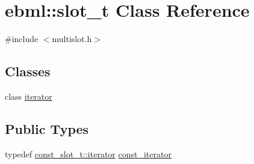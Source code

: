\hypertarget{classebml_1_1slot__t}{}\section{ebml\+:\+:slot\+\_\+t Class Reference}
\label{classebml_1_1slot__t}


{\ttfamily \#include $<$multislot.\+h$>$}

\subsection*{Classes}
\begin{DoxyCompactItemize}
\item 
class \mbox{\hyperlink{classebml_1_1slot__t_1_1iterator}{iterator}}
\end{DoxyCompactItemize}
\subsection*{Public Types}
\begin{DoxyCompactItemize}
\item 
typedef \mbox{\hyperlink{classebml_1_1const__slot__t_1_1iterator}{const\+\_\+slot\+\_\+t\+::iterator}} \mbox{\hyperlink{classebml_1_1slot__t_a035ab426d9062fc23e67d2b89f67ee84}{const\+\_\+iterator}}
\end{DoxyCompactItemize}
